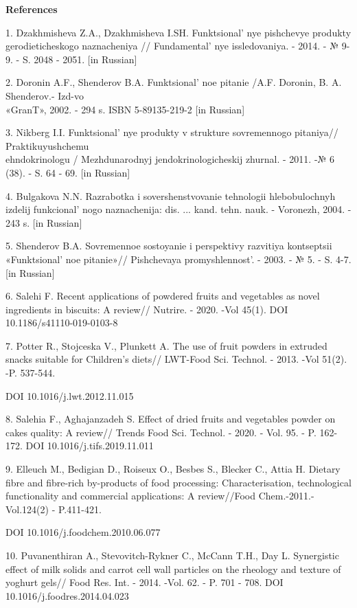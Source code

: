 \begin{center}
{\bfseries References}
\end{center}

\begin{references}
1. Dzakhmisheva Z.A., Dzakhmisheva I.SH. Funktsional' nye
pishchevye produkty gerodieticheskogo naznacheniya //
Fundamental' nye issledovaniya. - 2014. - № 9-9. - S.
2048 - 2051. {[}in Russian{]}

2. Doronin A.F., Shenderov B.A. Funktsional' noe pitanie
/A.F. Doronin, B. A. Shenderov.- Izd-vo \\«GranT», 2002. - 294 s. ISBN
5-89135-219-2 {[}in Russian{]}

3. Nikberg I.I. Funktsional' nye produkty v strukture
sovremennogo pitaniya// Praktikuyushchemu \\ehndokrinologu /
Mezhdunarodnyj jendokrinologicheskij zhurnal. - 2011. -№ 6 (38). - S. 64
- 69. {[}in Russian{]}

4. Bulgakova N.N. Razrabotka i sovershenstvovanie tehnologii
hlebobulochnyh izdelij funkcional' nogo naznachenija:
dis. ... kand. tehn. nauk. - Voronezh, 2004. - 243 s. {[}in Russian{]}

5. Shenderov B.A. Sovremennoe sostoyanie i perspektivy razvitiya
kontseptsii «Funktsional' noe pitanie»// Pishchevaya
promyshlennost'. - 2003. - № 5. - S. 4-7. {[}in
Russian{]}

6. Salehi F. Recent applications of powdered fruits and vegetables as
novel ingredients in biscuits: A review// Nutrire. - 2020. -Vol 45(1).
DOI 10.1186/s41110-019-0103-8

7. Potter R., Stojceska V., Plunkett A. The use of fruit powders in
extruded snacks suitable for Children's diets// LWT-Food Sci. Technol. -
2013. -Vol 51(2). -P. 537-544.

DOI 10.1016/j.lwt.2012.11.015

8. Salehia F., Aghajanzadeh S. Effect of dried fruits and vegetables
powder on cakes quality: A review// Trends Food Sci. Technol. - 2020. -
Vol. 95. - P. 162-172. DOI 10.1016/j.tifs.2019.11.011

9. Elleuch M., Bedigian D., Roiseux O., Besbes S., Blecker C., Attia H.
Dietary ﬁbre and ﬁbre-rich by-products of food processing:
Characterisation, technological functionality and commercial
applications: A review//Food Chem.-2011.-Vol.124(2) - P.411-421.

DOI 10.1016/j.foodchem.2010.06.077

10. Puvanenthiran A., Stevovitch-Rykner C., McCann T.H., Day L.
Synergistic effect of milk solids and carrot cell wall particles on the
rheology and texture of yoghurt gels// Food Res. Int. - 2014. -Vol. 62.
- P. 701 - 708. DOI 10.1016/j.foodres.2014.04.023


\end{references}

